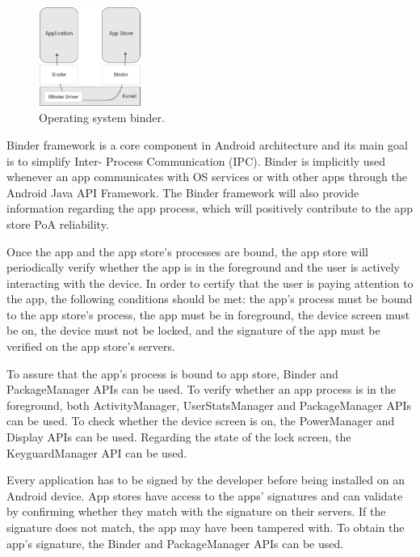 \begin{figure}[!ht]
\centering
\includegraphics[width=0.3\textwidth]{diagrams/binder_diagram.eps}
\caption{Operating system binder.}
\label{fig:binder}
\end{figure}

Binder framework is a core component in Android architecture and its main goal is to simplify Inter-
Process Communication (IPC). Binder is implicitly used whenever an app communicates with OS 
services or with other apps through the Android Java API Framework. The Binder framework will also 
provide information regarding the app process, which will positively contribute to the app store 
\textsf{PoA} reliability.

\medskip

Once the app and the app store's processes are bound, the app store will periodically verify whether 
the app is in the foreground and the user is actively interacting with the device. In order to certify that 
the user is paying attention to the app, the following conditions should be met: the app's process must be bound to the app store's process, the app must be in foreground, the device screen must be on, the device must not be locked, and the signature of the app must be verified on the app store's servers.

\medskip

To assure that the app's process is bound to app store, Binder and PackageManager APIs can be used. 
To verify whether an app process is in the foreground, both ActivityManager, UserStatsManager and  PackageManager APIs can be used. To check whether the device screen is on, the PowerManager 
and Display APIs can be used. Regarding the state of the lock screen, the KeyguardManager API can 
be used. 

\medskip

Every application has to be signed by the developer before being installed on an Android device. App 
stores have access to the apps' signatures and can validate by confirming whether they match with the 
signature on their servers. If the signature does not match, the app may have been tampered with. To obtain the app's signature, the Binder and PackageManager APIs can be used.

